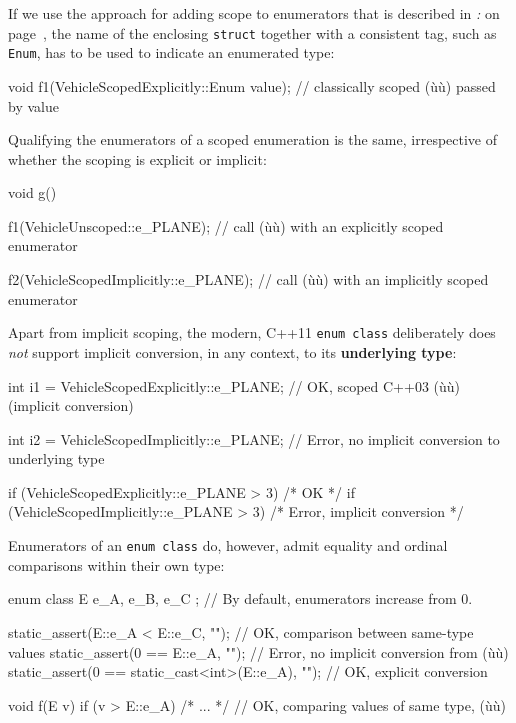 If we use the approach for
adding scope to enumerators that is described in \textit{: } on page~\pageref{drawbacks-relating-to-weakly-typed,-c++03-enumerators}, the name of the enclosing \texttt{struct} together with a
  consistent tag, such as \texttt{Enum}, has to be used to indicate an
  enumerated type:

  \begin{emcppslisting}[basicstyle={\ttfamily\footnotesize}]
  void f1(VehicleScopedExplicitly::Enum value);
      // classically scoped (ù{}ù) passed by value
  \end{emcppslisting}

\noindent Qualifying the enumerators of a scoped enumeration is the same,
irrespective of whether the scoping is explicit or implicit:

\begin{emcppslisting}
void g()
{
    f1(VehicleUnscoped::e_PLANE);
        // call (ù{}ù) with an explicitly scoped enumerator

    f2(VehicleScopedImplicitly::e_PLANE);
        // call (ù{}ù) with an implicitly scoped enumerator
}
\end{emcppslisting}

\noindent Apart from implicit scoping, the modern, C++11
\texttt{enum}~\texttt{class} deliberately does \emph{not} support
implicit conversion, in any context, to its \textbf{underlying type}:

\begin{emcppslisting}
int i1 = VehicleScopedExplicitly::e_PLANE;
    // OK, scoped C++03 (ù{}ù) (implicit conversion)

int i2 = VehicleScopedImplicitly::e_PLANE;
    // Error, no implicit conversion to underlying type

if (VehicleScopedExplicitly::e_PLANE > 3) { /* OK */ }
if (VehicleScopedImplicitly::e_PLANE > 3) { /* Error, implicit conversion */ }
\end{emcppslisting}

\noindent Enumerators of an \texttt{enum}~\texttt{class} do, however, admit
equality and ordinal comparisons within their own type:

\begin{emcppslisting}
enum class E { e_A, e_B, e_C };  // By default, enumerators increase from 0.

static_assert(E::e_A < E::e_C, "");  // OK, comparison between same-type values
static_assert(0 == E::e_A, "");      // Error, no implicit conversion from (ù{}ù)
static_assert(0 == static_cast<int>(E::e_A), "");  // OK, explicit conversion

void f(E v)
{
    if (v > E::e_A) { /* ... */ }  // OK, comparing values of same type, (ù{}ù)
}
\end{emcppslisting}


